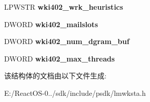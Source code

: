 \begin{DoxyCompactItemize}
\item 
\mbox{\label{struct___w_k_s_t_a___i_n_f_o__402_a78adb1243fcf2eded2d7515eed97c25e}} 
L\+P\+W\+S\+TR {\bfseries wki402\+\_\+wrk\+\_\+heuristics}
\item 
\mbox{\label{struct___w_k_s_t_a___i_n_f_o__402_a4722c14338a33c19b7d77bd4392d9d4a}} 
D\+W\+O\+RD {\bfseries wki402\+\_\+mailslots}
\item 
\mbox{\label{struct___w_k_s_t_a___i_n_f_o__402_a80d7666a4451db8d6be6aa8c27a0e6d9}} 
D\+W\+O\+RD {\bfseries wki402\+\_\+num\+\_\+dgram\+\_\+buf}
\item 
\mbox{\label{struct___w_k_s_t_a___i_n_f_o__402_af4299b6c473f756ad5897b219623d4fe}} 
D\+W\+O\+RD {\bfseries wki402\+\_\+max\+\_\+threads}
\end{DoxyCompactItemize}


该结构体的文档由以下文件生成\+:\begin{DoxyCompactItemize}
\item 
E\+:/\+React\+O\+S-\/0../sdk/include/psdk/lmwksta.\+h\end{DoxyCompactItemize}
